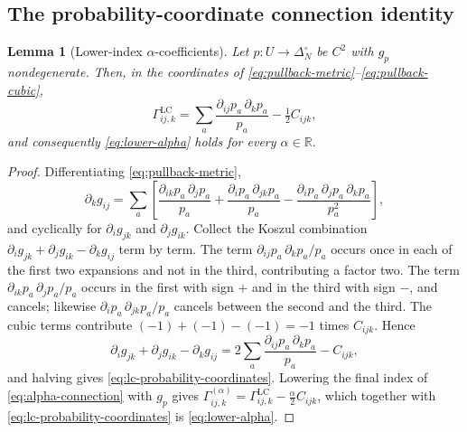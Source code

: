 \documentclass[11pt]{article}
\newtheorem{lemma}[theorem]{Lemma}
\theoremstyle{definition}
\theoremstyle{remark}
\newcommand{\simplex}{\Delta_{N}^{\circ}}
\newcommand{\R}{\mathbb{R}}
\newcommand{\LC}{\mathrm{LC}}
\begin{document}
\subsection{The probability-coordinate connection identity}

\begin{lemma}[Lower-index $\alpha$-coefficients]\label{lem:lower-alpha}
Let $p:U\to\simplex$ be $C^2$ with $g_p$ nondegenerate. Then, in the
coordinates of \eqref{eq:pullback-metric}--\eqref{eq:pullback-cubic},
\begin{equation}
    \Gamma^{\LC}_{ij,k}
    =\sum_a\frac{\partial_{ij}p_a\,\partial_kp_a}{p_a}
     -\tfrac12 C_{ijk},
    \label{eq:lc-probability-coordinates}
\end{equation}
and consequently \eqref{eq:lower-alpha} holds for every $\alpha\in\R$.
\end{lemma}

\begin{proof}
Differentiating \eqref{eq:pullback-metric},
\begin{equation}
    \partial_kg_{ij}
    =\sum_a\left[
      \frac{\partial_{ik}p_a\,\partial_jp_a}{p_a}
      +\frac{\partial_ip_a\,\partial_{jk}p_a}{p_a}
      -\frac{\partial_ip_a\,\partial_jp_a\,\partial_kp_a}{p_a^2}
    \right],
    \label{eq:metric-derivative-expansion}
\end{equation}
and cyclically for $\partial_ig_{jk}$ and $\partial_jg_{ik}$. Collect the
Koszul combination $\partial_ig_{jk}+\partial_jg_{ik}-\partial_kg_{ij}$ term by
term. The term $\partial_{ij}p_a\,\partial_kp_a/p_a$ occurs once in each of the
first two expansions and not in the third, contributing a factor two. The term
$\partial_{ik}p_a\,\partial_jp_a/p_a$ occurs in the first with sign $+$ and in
the third with sign $-$, and cancels; likewise
$\partial_ip_a\,\partial_{jk}p_a/p_a$ cancels between the second and the third.
The cubic terms contribute $(-1)+(-1)-(-1)=-1$ times $C_{ijk}$. Hence
\begin{equation}
    \partial_ig_{jk}+\partial_jg_{ik}-\partial_kg_{ij}
    =2\sum_a\frac{\partial_{ij}p_a\,\partial_kp_a}{p_a}
     -C_{ijk},
\end{equation}
and halving gives \eqref{eq:lc-probability-coordinates}. Lowering the final
index of \eqref{eq:alpha-connection} with $g_p$ gives
$\Gamma^{(\alpha)}_{ij,k}=\Gamma^{\LC}_{ij,k}-\tfrac{\alpha}{2}C_{ijk}$, which
together with \eqref{eq:lc-probability-coordinates} is \eqref{eq:lower-alpha}.
\end{proof}
\end{document}
